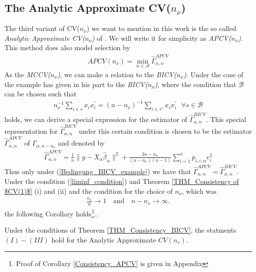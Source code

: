 \documentclass[Research_Module_ES.tex]{subfiles}
\begin{document}
\subsection{The Analytic Approximate CV($n_\nu$)}
The third variant of CV($n_\nu$) we want to mention in this work is the so called \textit{Analytic Approximate CV($n_\nu$)} of \cite{shao}. We will write it for simplicity as \textit{APCV($n_\nu$)}. This method does also model selection by 
\begin{align*}
APCV(n_\nu)=\min_{\alpha\in\mathcal{A}}\hat{\Gamma}_{\alpha,n}^{APCV}
\end{align*}
As the \textit{MCCV($n_\nu$)}, we can make a relation to the \textit{BICV($n_\nu$)}. Under the
case of the example \cite{shao} has given in his part to the \textit{BICV($n_\nu$)}, where the condition that $\mathcal{B}$ can be chosen such that
\begin{align}
\label{Bedingung_BICV_example}
	n_\nu^{-1}\sum_{i\in s}x_i x_i^\prime=(n-n_\nu)^{-1}\sum_{i\in s^c}x_i x_i^\prime~~~\forall s\in\mathcal{B}
\end{align}
holds, we can derive a special expression for the estimator of $\hat{\Gamma}_{\alpha,n}^{BICV}$. This special representation for $\hat{\Gamma}_{\alpha,n}^{BICV}$ under this certain condition is chosen to be the estimator $\hat{\Gamma}_{\alpha,n}^{APCV}$ of $\Gamma_{\alpha,n-n_\nu}$ and denoted by
\begin{align*}
\hat{\Gamma}_{\alpha,n}^{APCV}=\frac{1}{n}\lVert y-X_\alpha\hat{\beta}_\alpha\rVert^2 + \frac{2n-n_v}{(n-n_v)(n-1)}\sum_{i=1}^np_{i,i,\alpha}e_i^2
\end{align*} 
Thus only under (\ref{Bedingung_BICV_example}) we have that 
$\hat{\Gamma}_{\alpha,n}^{APCV}=\hat{\Gamma}_{\alpha,n}^{BICV}$. Under the condition (\ref{liminf_condition}) and Theorem \ref{THM_Consistency of $CV(1)$} (i) and (ii) and the condition for the choice of $n_\nu$, which was
\begin{align*}
\frac{n_v}{n}\to 1 \quad \textrm{and} \quad n-n_v \to \infty.
\end{align*}
the following Corollary holds\footnote{Proof of Corollary \ref{Consistency_APCV} is given in Appendix }..
\begin{coro}
\label{Consistency_APCV}
Under the conditions of Theorem \ref{THM_Consistency_BICV}, the statments $(I)-(III)$ hold for the Analytic Approximate $CV(n_v)$.
\end{coro}
\end{document}
